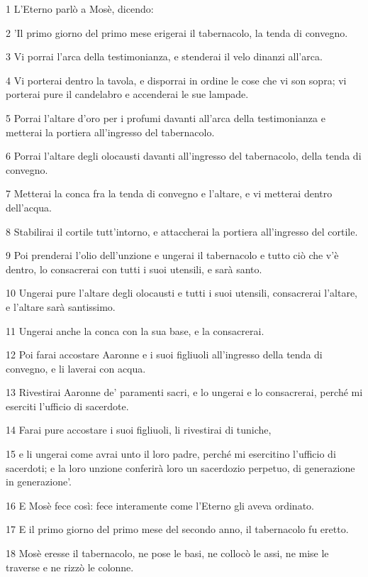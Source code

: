 \par 1 L'Eterno parlò a Mosè, dicendo:
\par 2 'Il primo giorno del primo mese erigerai il tabernacolo, la tenda di convegno.
\par 3 Vi porrai l'arca della testimonianza, e stenderai il velo dinanzi all'arca.
\par 4 Vi porterai dentro la tavola, e disporrai in ordine le cose che vi son sopra; vi porterai pure il candelabro e accenderai le sue lampade.
\par 5 Porrai l'altare d'oro per i profumi davanti all'arca della testimonianza e metterai la portiera all'ingresso del tabernacolo.
\par 6 Porrai l'altare degli olocausti davanti all'ingresso del tabernacolo, della tenda di convegno.
\par 7 Metterai la conca fra la tenda di convegno e l'altare, e vi metterai dentro dell'acqua.
\par 8 Stabilirai il cortile tutt'intorno, e attaccherai la portiera all'ingresso del cortile.
\par 9 Poi prenderai l'olio dell'unzione e ungerai il tabernacolo e tutto ciò che v'è dentro, lo consacrerai con tutti i suoi utensili, e sarà santo.
\par 10 Ungerai pure l'altare degli olocausti e tutti i suoi utensili, consacrerai l'altare, e l'altare sarà santissimo.
\par 11 Ungerai anche la conca con la sua base, e la consacrerai.
\par 12 Poi farai accostare Aaronne e i suoi figliuoli all'ingresso della tenda di convegno, e li laverai con acqua.
\par 13 Rivestirai Aaronne de' paramenti sacri, e lo ungerai e lo consacrerai, perché mi eserciti l'ufficio di sacerdote.
\par 14 Farai pure accostare i suoi figliuoli, li rivestirai di tuniche,
\par 15 e li ungerai come avrai unto il loro padre, perché mi esercitino l'ufficio di sacerdoti; e la loro unzione conferirà loro un sacerdozio perpetuo, di generazione in generazione'.
\par 16 E Mosè fece così: fece interamente come l'Eterno gli aveva ordinato.
\par 17 E il primo giorno del primo mese del secondo anno, il tabernacolo fu eretto.
\par 18 Mosè eresse il tabernacolo, ne pose le basi, ne collocò le assi, ne mise le traverse e ne rizzò le colonne.
